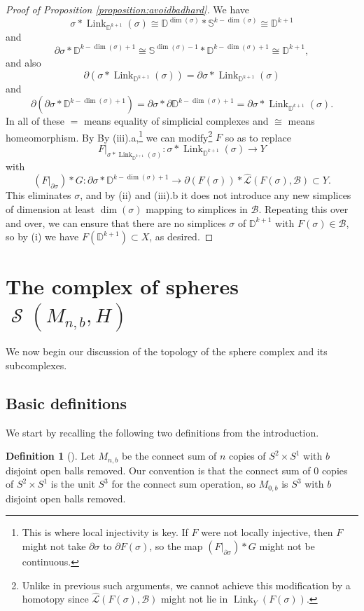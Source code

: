 \documentclass[11pt]{amsart}
\numberwithin{equation}{section}
\theoremstyle{plain}
\theoremstyle{definition}
\newtheorem{defn}[theorem]{Definition}
\newenvironment{definition}[1][]{\begin{defn}[#1]\pushQED{\qed}}{\popQED \end{defn}}
\theoremstyle{remark}
\newcommand\cB{\ensuremath{\mathcal{B}}}
\newcommand\cL{\ensuremath{\mathcal{L}}}
\newcommand\bbD{\ensuremath{\mathbb{D}}}
\newcommand\bbS{\ensuremath{\mathbb{S}}}
\newcommand\hcL{\ensuremath{\widehat{\cL}}}
\DeclareMathOperator{\Spheres}{\mathcal{S}}
\DeclareMathOperator{\Link}{Link}
\begin{document}
\begin{proof}[Proof of Proposition \ref{proposition:avoidbadhard}]
We have
\[\sigma \ast \Link_{\bbD^{k+1}}\left(\sigma\right) \cong \bbD^{\dim(\sigma)} \ast \bbS^{k-\dim(\sigma)} \cong \bbD^{k+1}\]
and
\[\partial \sigma \ast \bbD^{k-\dim(\sigma)+1} \cong \bbS^{\dim(\sigma)-1} \ast \bbD^{k-\dim(\sigma)+1} \cong \bbD^{k+1},\]
and also
\[\partial\left(\sigma \ast \Link_{\bbD^{k+1}}\left(\sigma\right)\right) = \partial \sigma \ast \Link_{\bbD^{k+1}}\left(\sigma\right)\]
and
\[\partial\left(\partial \sigma \ast \bbD^{k-\dim(\sigma)+1}\right) = \partial \sigma \ast \partial \bbD^{k-\dim(\sigma)+1} = \partial \sigma \ast \Link_{\bbD^{k+1}}(\sigma).\]
In all of these $=$ means equality of simplicial complexes and $\cong$ means homeomorphism.  By
By (iii).a,\footnote{This is where local injectivity is key.  If $F$ were not locally injective, then
$F$ might not take $\partial \sigma$ to $\partial F(\sigma)$, so the map
$\left(F|_{\partial \sigma}\right) \ast G$ might not be continuous.}
we can modify\footnote{Unlike in previous such arguments, we cannot achieve this modification
by a homotopy since $\hcL(F(\sigma),\cB)$ might not lie in $\Link_{Y}(F(\sigma))$.} $F$ so as to replace
\[F|_{\sigma \ast \Link_{\bbD^{k+1}}(\sigma)}\colon \sigma \ast \Link_{\bbD^{k+1}}(\sigma) \rightarrow Y\]
with
\[\left(F|_{\partial \sigma}\right) \ast G \colon \partial \sigma \ast \bbD^{k-\dim(\sigma)+1} \rightarrow \partial(F(\sigma)) \ast \hcL(F(\sigma),\cB) \subset Y.\]
This eliminates $\sigma$, and by (ii) and (iii).b it does not introduce
any new simplices of dimension at least $\dim(\sigma)$ mapping to simplices in $\cB$.
Repeating this over and over, we can ensure that there are no simplices $\sigma$ of $\bbD^{k+1}$
with $F(\sigma) \in \cB$, so by (i) we have $F(\bbD^{k+1}) \subset X$, as desired.
\end{proof}

\section{The complex of spheres \texorpdfstring{$\Spheres(M_{n,b},H)$}{S(M,H)}}
\label{section:spheres}

We now begin our discussion of the topology of the sphere complex and its subcomplexes.

\subsection{Basic definitions}
We start by recalling the following two definitions from the introduction.

\begin{definition}
Let $M_{n,b}$ be the connect sum of $n$ copies of $S^2 \times S^1$ with
$b$ disjoint open balls removed.  Our convention is that the connect sum of
$0$ copies of $S^2 \times S^1$ is the unit $S^3$ for the connect sum operation,
so $M_{0,b}$ is $S^3$ with $b$ disjoint open balls removed.
\end{definition}
\end{document}
